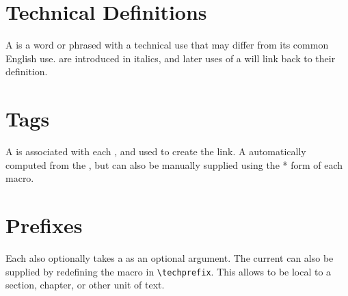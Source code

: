 \documentclass{article}
\begin{document}
\section{Technical Definitions}
A  is a word or phrased with a technical use that
may differ from its common English use.
 are introduced in italics, and later uses of a
 will link back to their definition.

\lipsum

\section{Tags}
A  is associated with each , and
used to create the link.
A  automatically computed from the ,
but can also be manually supplied using the * form of each macro.

\lipsum
\section{Prefixes}
Each  also optionally takes a
 as an optional argument.
The current  can also be supplied by redefining the
macro in \verb|\techprefix|.
This allows  to be local to a section, chapter, or
other unit of text.
\end{document}
